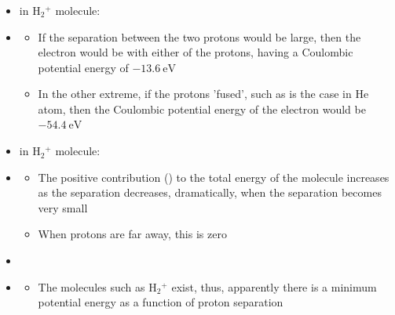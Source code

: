 \begin{frame}
\frametitle{\texorpdfstring{\culine[\sectiontitleulinecolor]{\sectiontitle}}{\sectiontitle} }

\begin{itemize}
	\item {} in $\mathrm{H}_{2}{ }^{+}$ molecule:
	\item[] \begin{itemize} \small
	\item If the separation between the two protons would be large, then the electron would be with either of the protons, having a Coulombic potential energy of $-13.6~\mathrm{eV}$ 
\item In the other extreme, if the protons 'fused', such as is the case in He atom, then the Coulombic potential energy of the electron would be $-54.4~\mathrm{eV}$
\end{itemize}


\item {} in $\mathrm{H}_{2}{ }^{+}$ molecule:
\item[] \begin{itemize} \small
	\item The positive contribution () to the total energy of the molecule increases as the separation decreases, dramatically, when the separation becomes very small
\item When protons are far away, this is zero
\end{itemize}

\item {}
\item[] \begin{itemize} \small
	\item The molecules such as $\mathrm{H}_{2}{ }^{+}$ exist, thus, apparently there is a minimum potential energy as a function of proton separation
\end{itemize}


\end{itemize}


\endofslide 
\end{frame}

